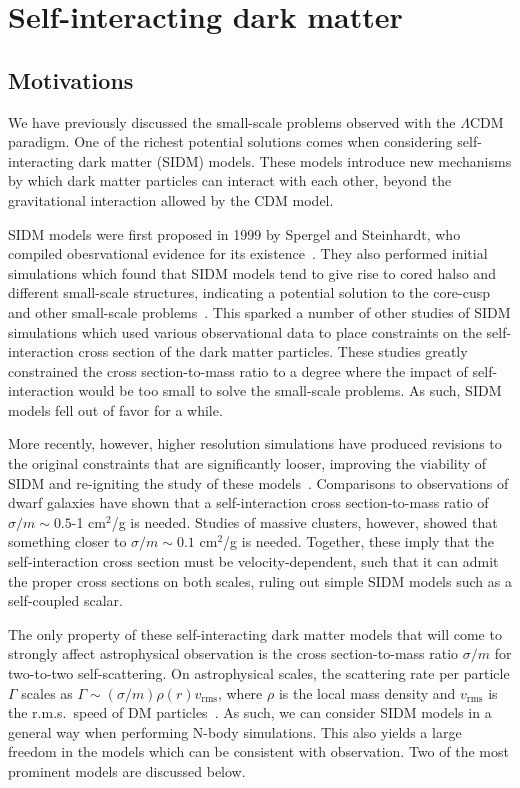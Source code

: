 \chapter{Self-interacting dark matter}
\label{sec:sidm}

\section{Motivations}
We have previously discussed the small-scale problems observed with the
$\Lambda$CDM paradigm. One of the richest potential solutions comes when
considering self-interacting dark matter (SIDM) models. These models introduce
new mechanisms by which dark matter particles can interact with each other,
beyond the gravitational interaction allowed by the CDM model.

SIDM models were first proposed in 1999 by Spergel and Steinhardt, who compiled
obesrvational evidence for its existence~\cite{spergel_observational_2000}.
They also performed initial simulations which found that SIDM models tend to
give rise to cored halso and different small-scale structures, indicating a
potential solution to the core-cusp and other small-scale
problems~\cite{dave_halo_2001}. This sparked a number of other studies of
SIDM simulations which used various observational data to place constraints
on the self-interaction cross section of the dark matter particles. These
studies greatly constrained the cross section-to-mass ratio to a degree where
the impact of self-interaction would be too small to solve the small-scale
problems. As such, SIDM models fell out of favor for a while.

More recently, however, higher resolution simulations have produced revisions to
the original constraints that are significantly looser, improving the viability
of SIDM and re-igniting the study of these models~\cite{tulin_dark_2018}.
Comparisons to observations of dwarf galaxies have shown that a self-interaction
cross section-to-mass ratio of $\sigma / m \sim 0.5$-1 cm$^2$/g is needed.
Studies of massive clusters, however, showed that something closer to $\sigma /
m \sim 0.1$ cm$^2$/g is needed. Together, these imply that the self-interaction
cross section must be velocity-dependent, such that it can admit the proper
cross sections on both scales, ruling out simple SIDM models such as a
self-coupled scalar.

The only property of these self-interacting dark matter models that will come to
strongly affect astrophysical observation is the cross section-to-mass ratio
$\sigma/m$ for two-to-two self-scattering. On astrophysical scales, the
scattering rate per particle $\Gamma$ scales as $\Gamma \sim (\sigma/m)
\rho(r) v_{\text{rms}}$, where $\rho$ is the local mass density and
$v_\text{rms}$ is the r.m.s.~speed of DM particles~\cite{robles_sidm_2017}.
As such, we can consider SIDM models in a general way when performing N-body
simulations. This also yields a large freedom in the models which can be
consistent with observation. Two of the most prominent models are discussed
below. 

